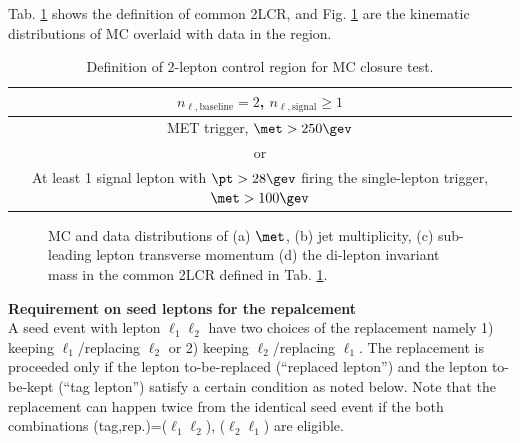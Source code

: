 Tab. \ref{tab::BGestimation::objRep::def2LCR} shows the definition of common 2LCR, and Fig. \ref{fig::BGestimation::objRep::2LCR} are the kinematic distributions of MC overlaid with data in the region. 

\begin{table}[h]
  \begin{center}
    \caption{Definition of 2-lepton control region for MC closure test.}
    \begin{tabular}{ c }
      \hline
       $n_{\ell, \mathrm{baseline}}=2$, $n_{\ell, \mathrm{signal}}\ge 1$ \\
      \hline
       MET trigger,  $\met>250\gev$   \\
       or \\
       At least 1 signal lepton with $\pt>28 \gev$ firing the single-lepton trigger, $\met>100\gev$   \\
      \hline
    \end{tabular}  \label{tab::BGestimation::objRep::def2LCR}
  \end{center}
\end{table}

\clearpage
\begin{figure}[h]
  \centering
 
   \caption{ MC and data distributions of (a) $\met$, (b) jet multiplicity, (c) sub-leading lepton transverse momentum (d) the di-lepton invariant mass in the common 2LCR defined in Tab. \ref{tab::BGestimation::objRep::def2LCR}.  \label{fig::BGestimation::objRep::2LCR}}    
\end{figure}
\clearpage



\noindent \textbf{Requirement on seed leptons for the repalcement} \\
A seed event with lepton $\ell_1 \ell_2$ have two choices of the replacement namely 1) keeping $\ell_1$/replacing $\ell_2$ or 2) keeping $\ell_2$/replacing $\ell_1$. The replacement is proceeded only if the lepton to-be-replaced (``replaced lepton'') and the lepton to-be-kept (``tag lepton'') satisfy a certain condition as noted below. Note that the replacement can happen twice from the identical seed event if the both combinations (tag,rep.)=($\ell_1 \ell_2$), ($\ell_2 \ell_1$) are eligible. \\

